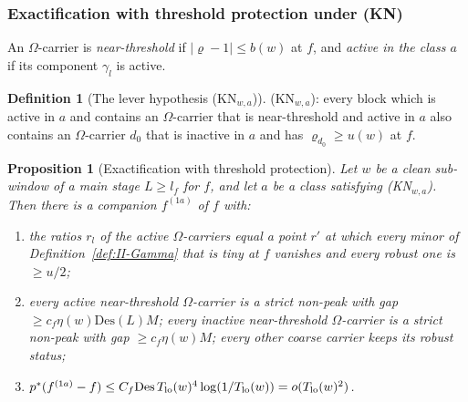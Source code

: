 \documentclass[10pt]{amsart}
\newtheorem{proposition}[theorem]{Proposition}
\theoremstyle{definition}
\newtheorem{definition}[theorem]{Definition}
\theoremstyle{remark}
\begin{document}
\subsubsection*{Exactification with threshold protection under (KN)}

An $\Omega$-carrier is \emph{near-threshold} if $|\varrho-1|\le b(w)$ at $f$, and
\emph{active in the class $a$} if its component $\gamma_l$ is active.

\begin{definition}[The lever hypothesis (KN$_{w,a}$)]\label{def:II-KN}
\textup{(KN$_{w,a}$)}: every block which is active in $a$ and contains an
$\Omega$-carrier that is near-threshold and active in $a$ also contains an
$\Omega$-carrier $d_0$ that is inactive in $a$ and has $\varrho_{d_0}\ge u(w)$ at $f$.
\end{definition}

\begin{proposition}[Exactification with threshold protection]\label{prop:II-KN}
Let $w$ be a clean sub-window of a main stage $L\ge l_f$ for $f$, and let $a$ be
a class satisfying \textup{(KN$_{w,a}$)}.  Then there is a companion $f^{(1a)}$ of $f$
with:
\begin{enumerate}
\item[(a)] the ratios $r_l$ of the active $\Omega$-carriers equal a point $r'$ at
which every minor of Definition~\textup{\ref{def:II-Gamma}} that is tiny at $f$
vanishes and every robust one is $\ge u/2$;
\item[(b)] every active near-threshold $\Omega$-carrier is a strict non-peak with
gap $\ge c_f\eta(w)\mathrm{Des}(L)M$; every inactive near-threshold $\Omega$-carrier is a
strict non-peak with gap $\ge c_f\eta(w)M$; every other coarse carrier keeps its
robust status;
\item[(c)] $p^*(f^{(1a)}-f)\le C_f\mathrm{Des}\,T_{\rm lo}(w)^4\log(1/T_{\rm lo}(w))=o(T_{\rm
lo}(w)^2)$.
\end{enumerate}
\end{proposition}
\end{document}
